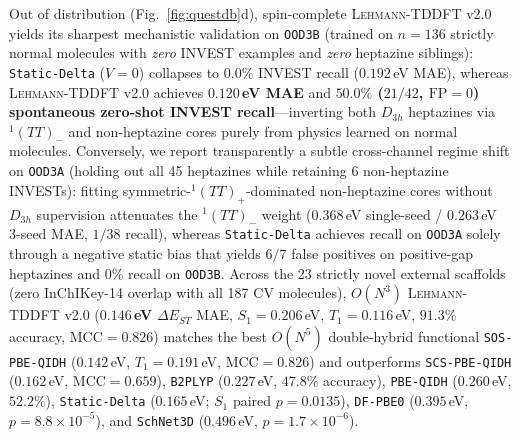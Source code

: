 \documentclass[10pt,twocolumn]{article}
\theoremstyle{natthm}
\newcommand{\leh}{\textsc{Lehmann-TDDFT}}
\newcommand{\dEST}{\Delta E_{ST}}
\begin{document}
Out of distribution (Fig.~\ref{fig:questdb}d), spin-complete \leh{} v2.0 yields its sharpest mechanistic validation on \texttt{OOD3B} (trained on $n=136$ strictly normal molecules with \emph{zero} INVEST examples and \emph{zero} heptazine siblings): \texttt{Static-Delta} ($V=0$) collapses to $0.0\%$ INVEST recall ($0.192$\,eV MAE), whereas \leh{} v2.0 achieves \textbf{$0.120$\,eV MAE} and \textbf{$50.0\%$ ($21/42$, $\mathrm{FP}=0$) spontaneous zero-shot INVEST recall}---inverting both $D_{3h}$ heptazines via $^1(TT)_-$ and non-heptazine cores purely from physics learned on normal molecules.
Conversely, we report transparently a subtle cross-channel regime shift on \texttt{OOD3A} (holding out all 45 heptazines while retaining 6 non-heptazine INVESTs): fitting symmetric-$^1(TT)_+$-dominated non-heptazine cores without $D_{3h}$ supervision attenuates the $^1(TT)_-$ weight ($0.368$\,eV single-seed / $0.263$\,eV 3-seed MAE, $1/38$ recall), whereas \texttt{Static-Delta} achieves recall on \texttt{OOD3A} solely through a negative static bias that yields $6/7$ false positives on positive-gap heptazines and $0\%$ recall on \texttt{OOD3B}.
Across the 23 strictly novel external scaffolds (zero InChIKey-14 overlap with all 187 CV molecules), $O(N^3)$ \leh{} v2.0 (\textbf{$0.146$\,eV} $\dEST$ MAE, $S_1=0.206$\,eV, $T_1=0.116$\,eV, $91.3\%$ accuracy, $\mathrm{MCC}=0.826$) matches the best $O(N^5)$ double-hybrid functional \texttt{SOS-PBE-QIDH} ($0.142$\,eV, $T_1=0.191$\,eV, $\mathrm{MCC}=0.826$) and outperforms \texttt{SCS-PBE-QIDH} ($0.162$\,eV, $\mathrm{MCC}=0.659$), \texttt{B2PLYP} ($0.227$\,eV, $47.8\%$ accuracy), \texttt{PBE-QIDH} ($0.260$\,eV, $52.2\%$), \texttt{Static-Delta} ($0.165$\,eV; $S_1$ paired $p=0.0135$), \texttt{DF-PBE0} ($0.395$\,eV, $p=8.8\times 10^{-5}$), and \texttt{SchNet3D} ($0.496$\,eV, $p=1.7\times 10^{-6}$).
\end{document}
